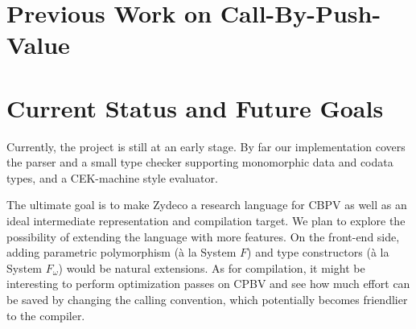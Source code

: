 \documentclass[acmsmall,nonacm]{acmart}
\begin{document}

\begin{listing}[ht]
    \begin{multicols}{2}
        \inputminted{Haskell}{examples/sumfn.zydeco}
        \vfill
        \inputminted{Haskell}{examples/sumco.zydeco}
        \vfill
    \end{multicols}
    \label{code: sum}
\end{listing}


\section{Previous Work on Call-By-Push-Value}

\section{Current Status and Future Goals}

Currently, the project is still at an early stage. By far our implementation covers the parser and a small type checker supporting monomorphic data and codata types, and a CEK-machine style evaluator.

The ultimate goal is to make Zydeco a research language for CBPV as well as an ideal intermediate representation and compilation target. We plan to explore the possibility of extending the language with more features. On the front-end side, adding parametric polymorphism (à la System $F$) and type constructors (à la System $F_\omega$) would be natural extensions. As for compilation, it might be interesting to perform optimization passes on CPBV and see how much effort can be saved by changing the calling convention, which potentially becomes friendlier to the compiler.
\end{document}
